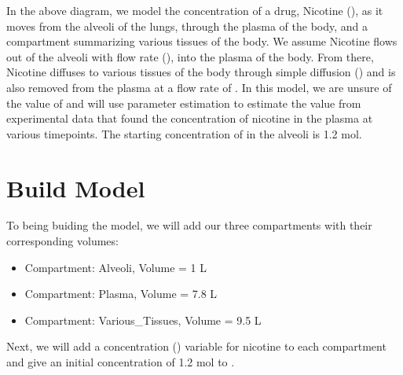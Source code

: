 \documentclass[letterpaper,10pt,english]{sphinxmanual}
\begin{document}
\sphinxAtStartPar
In the above diagram, we model the concentration of a drug, Nicotine (), as
it moves from the alveoli of the lungs, through the plasma of the body, and a
compartment summarizing various tissues of the body. We assume Nicotine flows
out of the alveoli with flow rate (), into the plasma of the body.
From there, Nicotine diffuses to various tissues of the body through simple
diffusion () and is also removed from the plasma at a flow rate of
.  In this model, we are unsure of the value of  and will use
parameter estimation to estimate the value from experimental data that found
the concentration of nicotine in the plasma at various timepoints. The starting
concentration of  in the alveoli is 1.2 mol.


\section{Build Model}
\label{\detokenize{pages/tutorial_par_estimation:build-model}}
\sphinxAtStartPar
To being buiding the model, we will add our three compartments with their
corresponding volumes:
\begin{itemize}
\item {} 
\sphinxAtStartPar
Compartment: Alveoli, Volume = 1 L

\item {} 
\sphinxAtStartPar
Compartment: Plasma, Volume = 7.8 L

\item {} 
\sphinxAtStartPar
Compartment: Various\_Tissues, Volume = 9.5 L

\end{itemize}

\begin{figure}[htbp]
\centering

\noindent{}
\end{figure}

\sphinxAtStartPar
Next, we will add a concentration () variable for nicotine to each
compartment and give an initial concentration of 1.2 mol to .

\begin{figure}[htbp]
\centering

\noindent{}
\end{figure}
\end{document}
